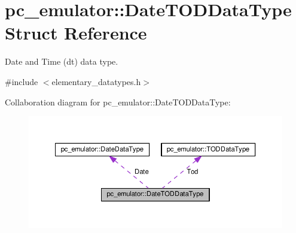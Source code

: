 \hypertarget{structpc__emulator_1_1DateTODDataType}{}\section{pc\+\_\+emulator\+:\+:Date\+T\+O\+D\+Data\+Type Struct Reference}
\label{structpc__emulator_1_1DateTODDataType}


Date and Time (dt) data type.  




{\ttfamily \#include $<$elementary\+\_\+datatypes.\+h$>$}



Collaboration diagram for pc\+\_\+emulator\+:\+:Date\+T\+O\+D\+Data\+Type\+:
\nopagebreak
\begin{figure}[H]
\begin{center}
\leavevmode
\includegraphics[width=350pt]{structpc__emulator_1_1DateTODDataType__coll__graph}
\end{center}
\end{figure}
